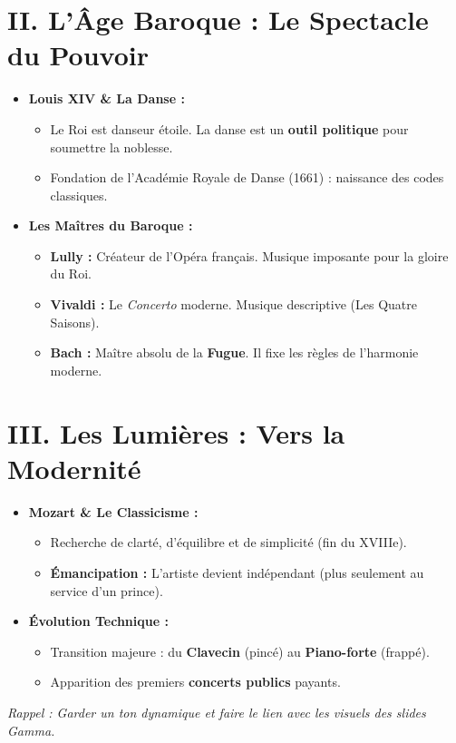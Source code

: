 \documentclass[12pt]{article}
\begin{document}
\section*{\textcolor{mainblue}{II. L'Âge Baroque : Le Spectacle du Pouvoir}}
\begin{itemize}[label=\textcolor{mainblue}{$\bullet$}]
    \item \textbf{\textcolor{importantred}{Louis XIV & La Danse :}} 
        \begin{itemize}[label=--]
            \item Le Roi est danseur étoile. La danse est un \textbf{outil politique} pour soumettre la noblesse.
            \item Fondation de l'Académie Royale de Danse (1661) : naissance des codes classiques.
        \end{itemize}
    \item \textbf{\textcolor{importantred}{Les Maîtres du Baroque :}} 
        \begin{itemize}[label=--]
            \item \textbf{Lully :} Créateur de l'Opéra français. Musique imposante pour la gloire du Roi.
            \item \textbf{Vivaldi :} Le \textit{Concerto} moderne. Musique descriptive (Les Quatre Saisons).
            \item \textbf{Bach :} Maître absolu de la \textbf{Fugue}. Il fixe les règles de l'harmonie moderne.
        \end{itemize}
\end{itemize}

\vspace{0.5cm}

\section*{\textcolor{mainblue}{III. Les Lumières : Vers la Modernité}}
\begin{itemize}[label=\textcolor{mainblue}{$\bullet$}]
    \item \textbf{\textcolor{importantred}{Mozart & Le Classicisme :}} 
        \begin{itemize}[label=--]
            \item Recherche de clarté, d'équilibre et de simplicité (fin du XVIIIe).
            \item \textbf{Émancipation :} L'artiste devient indépendant (plus seulement au service d'un prince).
        \end{itemize}
    \item \textbf{\textcolor{importantred}{Évolution Technique :}} 
        \begin{itemize}[label=--]
            \item Transition majeure : du \textbf{Clavecin} (pincé) au \textbf{Piano-forte} (frappé).
            \item Apparition des premiers \textbf{concerts publics} payants.
        \end{itemize}
\end{itemize}

\vspace{0.8cm}

\begin{center}
    \textit{\small Rappel : Garder un ton dynamique et faire le lien avec les visuels des slides Gamma.}
\end{center}
\end{document}
